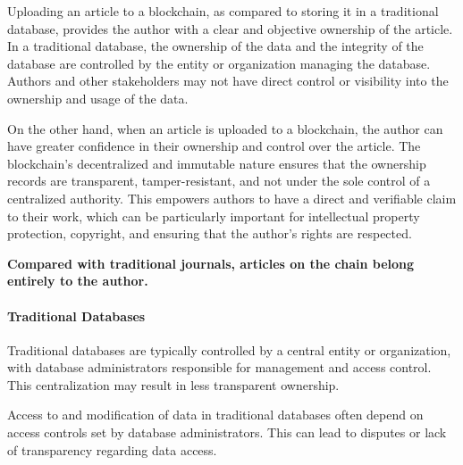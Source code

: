 \documentclass[lettersize,journal]{IEEEtran}
\begin{document}
Uploading an article to a blockchain, as compared to storing it in a traditional database, provides the author with a clear and objective ownership of the article. In a traditional database, the ownership of the data and the integrity of the database are controlled by the entity or organization managing the database. Authors and other stakeholders may not have direct control or visibility into the ownership and usage of the data.

On the other hand, when an article is uploaded to a blockchain, the author can have greater confidence in their ownership and control over the article. The blockchain's decentralized and immutable nature ensures that the ownership records are transparent, tamper-resistant, and not under the sole control of a centralized authority. This empowers authors to have a direct and verifiable claim to their work, which can be particularly important for intellectual property protection, copyright, and ensuring that the author's rights are respected.



\textbf{Compared with traditional journals, articles on the chain belong entirely to the author.}


\paragraph{Traditional Databases}

Traditional databases are typically controlled by a central entity or organization, with database administrators responsible for management and access control. This centralization may result in less transparent ownership.

Access to and modification of data in traditional databases often depend on access controls set by database administrators. This can lead to disputes or lack of transparency regarding data access.
\end{document}
